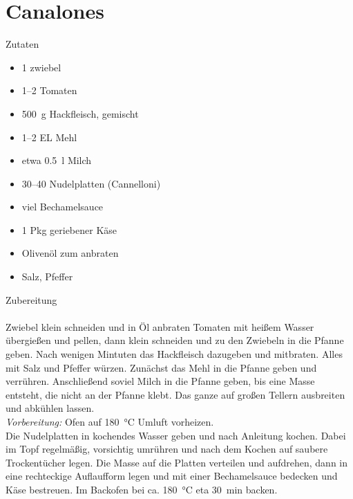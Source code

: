 \section*{Canalones}
\ihead{}\ohead{}
\cfoot{}
{\Large Zutaten}
\begin{multicols}{2}
\begin{itemize}
    \item \num{1} zwiebel
    \item \numrange{1}{2} Tomaten
    \item \SI{500}{g} Hackfleisch, gemischt
    \item \numrange{1}{2} EL Mehl
    \item etwa \SI{0.5}{l} Milch 
    \item \numrange{30}{40} Nudelplatten (Cannelloni)
    \item viel Bechamelsauce
    \item \num{1} Pkg geriebener Käse
    \item Olivenöl zum anbraten
    \item Salz, Pfeffer
\end{itemize}
\end{multicols}
\noindent
{\Large Zubereitung}\\
\\
Zwiebel klein schneiden und in Öl anbraten
Tomaten mit heißem Wasser übergießen und pellen, dann klein schneiden und zu den Zwiebeln in die Pfanne geben.
Nach wenigen Mintuten das Hackfleisch dazugeben und mitbraten.
Alles mit Salz und Pfeffer würzen.
Zunächst das Mehl in die Pfanne geben und verrühren. 
Anschließend soviel Milch in die Pfanne geben, bis eine Masse entsteht, die nicht an der Pfanne klebt.
Das ganze auf großen Tellern ausbreiten und abkühlen lassen.\\
\textit{Vorbereitung:} Ofen auf \SI{180}{\celsius} Umluft vorheizen.\\
Die Nudelplatten in kochendes Wasser geben und nach Anleitung kochen. 
Dabei im Topf regelmäßig, vorsichtig umrühren und nach dem Kochen auf saubere Trockentücher legen.
Die Masse auf die Platten verteilen und aufdrehen, dann in eine rechteckige Auflaufform legen und mit einer Bechamelsauce bedecken und Käse bestreuen.
Im Backofen bei ca. \SI{180}{\celsius} eta \SI{30}{min} backen.

